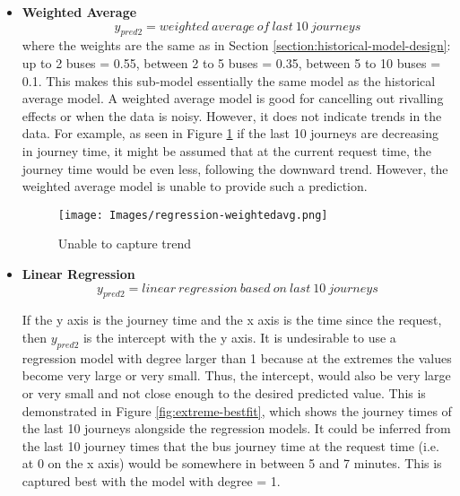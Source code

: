 \begin{itemize}
    \item \textbf{Weighted Average}
    \begin{equation}
        y_{pred2} = weighted\ average\ of\ last\ 10\ journeys
    \end{equation}
    where the weights are the same as in Section \ref{section:historical-model-design}: up to 2 buses = 0.55, between 2 to 5 buses = 0.35, between 5 to 10 buses = 0.1. This makes this sub-model essentially the same model as the historical average model. A weighted average model is good for cancelling out rivalling effects or when the data is noisy. However, it does not indicate trends in the data. For example, as seen in Figure \ref{fig:weighted-avg-regression} if the last 10 journeys are decreasing in journey time, it might be assumed that at the current request time, the journey time would be even less, following the downward trend. However, the weighted average model is unable to provide such a prediction.
    
    \begin{figure}[H]
    \begin{center}
        \texttt{[image: Images/regression-weightedavg.png]}
        \caption{Unable to capture trend}
        \label{fig:weighted-avg-regression}
    \end{center}
    \end{figure}
    
    \item \textbf{Linear Regression}
    \begin{equation}
        y_{pred2} = linear\ regression\ based\ on\ last\ 10\ journeys
    \end{equation}
    
    If the y axis is the journey time and the x axis is the time since the request, then $y_{pred2}$ is the intercept with the y axis. It is undesirable to use a regression model with degree larger than 1 because at the extremes the values become very large or very small. Thus, the intercept, would also be very large or very small and not close enough to the desired predicted value. This is demonstrated in Figure \ref{fig:extreme-bestfit}, which shows the journey times of the last 10 journeys alongside the regression models. It could be inferred from the last 10 journey times that the bus journey time at the request time (i.e. at 0 on the x axis) would be somewhere in between 5 and 7 minutes. This is captured best with the model with degree = 1.
    

\end{itemize}
